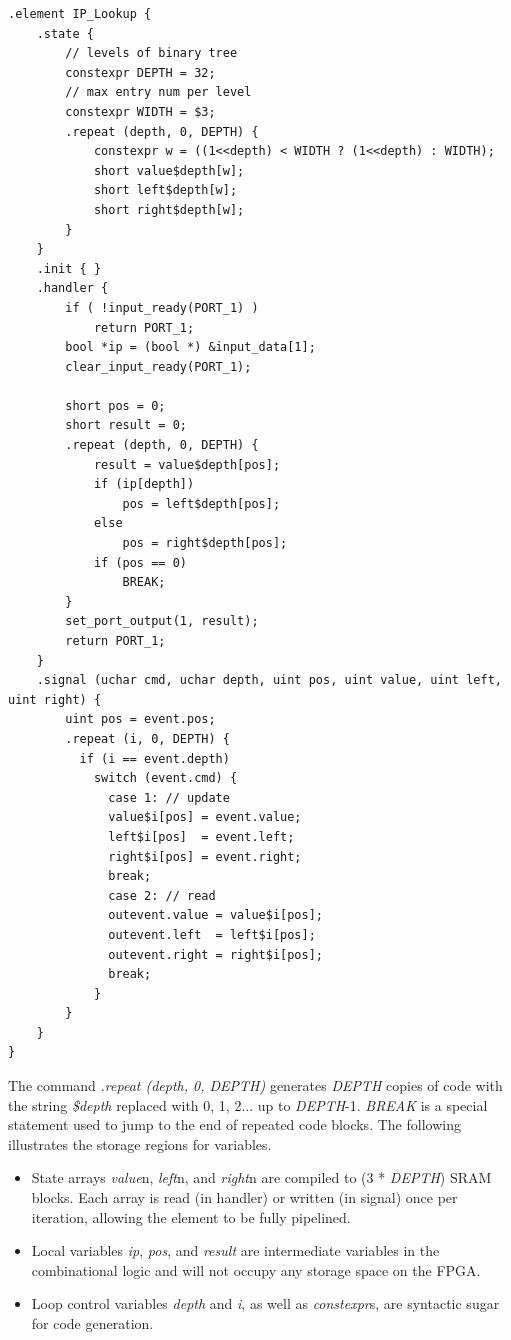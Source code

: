 \begin{lstlisting}
.element IP_Lookup {
    .state {
        // levels of binary tree
        constexpr DEPTH = 32;
        // max entry num per level
        constexpr WIDTH = $3;
        .repeat (depth, 0, DEPTH) {
            constexpr w = ((1<<depth) < WIDTH ? (1<<depth) : WIDTH);
            short value$depth[w];
            short left$depth[w];
            short right$depth[w];
        }
    }
    .init { }
    .handler {
        if ( !input_ready(PORT_1) )
            return PORT_1;
        bool *ip = (bool *) &input_data[1];
        clear_input_ready(PORT_1);

        short pos = 0;
        short result = 0;
        .repeat (depth, 0, DEPTH) {
            result = value$depth[pos];
            if (ip[depth])
                pos = left$depth[pos];
            else
                pos = right$depth[pos];
            if (pos == 0)
                BREAK;
        }
        set_port_output(1, result);
        return PORT_1;
    }
    .signal (uchar cmd, uchar depth, uint pos, uint value, uint left, uint right) {
        uint pos = event.pos;
        .repeat (i, 0, DEPTH) {
          if (i == event.depth)
            switch (event.cmd) {
              case 1: // update
              value$i[pos] = event.value;
              left$i[pos]  = event.left;
              right$i[pos] = event.right;
              break;
              case 2: // read
              outevent.value = value$i[pos];
              outevent.left  = left$i[pos];
              outevent.right = right$i[pos];
              break;
            }
        }
    }
}
\end{lstlisting}

The command \textit{.repeat (depth, 0, DEPTH)} generates \textit{DEPTH} copies of code with the string \textit{\$depth} replaced with 0, 1, 2... up to \textit{DEPTH}-1. \textit{BREAK} is a special statement used to jump to the end of repeated code blocks. The following illustrates the storage regions for variables.

\begin{itemize}
	\item State arrays \textit{value}n, \textit{left}n, and \textit{right}n are compiled to (3 * \textit{DEPTH}) SRAM blocks. Each array is read (in handler) or written (in signal) once per iteration, allowing the element to be fully pipelined.
	\item Local variables \textit{ip}, \textit{pos}, and \textit{result} are intermediate variables in the combinational logic and will not occupy any storage space on the FPGA.
	\item Loop control variables \textit{depth} and \textit{i}, as well as \textit{constexpr}s, are syntactic sugar for code generation.
\end{itemize}

